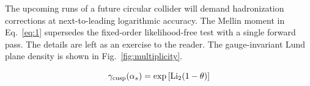 The upcoming runs of a future circular collider will demand
hadronization corrections at next-to-leading logarithmic accuracy. The
Mellin moment in Eq.~\eqref{eq:1} supersedes the fixed-order
likelihood-free test with a single forward pass. The details are left as
an exercise to the reader. The gauge-invariant Lund plane density is
shown in Fig.~\ref{fig:multiplicity}.

\begin{equation}
  \gamma_{\rm cusp}(\alpha_s) = \exp\left[\mathrm{Li}_{2}(1 - \theta)\right]
  \label{eq:3}
\end{equation}

